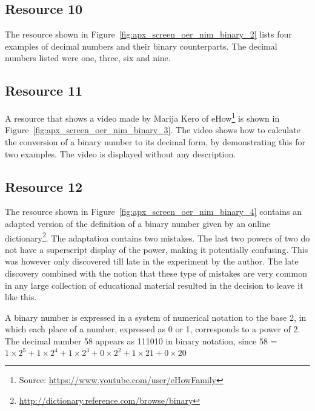\subsection{Resource 10}
The resource shown in Figure~\ref{fig:apx_screen_oer_nim_binary_2} lists four
examples of decimal numbers and their binary counterparts.
The decimal numbers listed were one, three, six and nine.
\subsection{Resource 11}
A resource that shows a video made by Marija Kero of eHow\footnote{Source:
	\url{https://www.youtube.com/user/eHowFamily}} is shown in
	Figure~\ref{fig:apx_screen_oer_nim_binary_3}.
The video shows how to calculate the conversion of a binary number to its
decimal form, by demonstrating this for two examples. The video is displayed
without any description.
\subsection{Resource 12}
The resource shown in Figure~\ref{fig:apx_screen_oer_nim_binary_4} contains
an adapted version of the definition of a binary number given by an online
dictionary\footnote{\url{http://dictionary.reference.com/browse/binary}}.
The adaptation contains two mistakes. The last two powers of two do not have
a superscript display of the power, making it potentially confusing. This was
however only discovered till late in the experiment by the author. The late
discovery combined with the notion that these type of mistakes are very common
in any large collection of educational material resulted in the decision to
leave it like this.
\begin{framed}\noindent
 A binary number is expressed in a system of numerical notation to the base 2,
 in which each place of a number, expressed as 0 or 1, corresponds to a power
 of 2. The decimal number 58 appears as 111010 in binary notation, since 58
 = $1\times2^5+1\times2^4+1\times2^3+0\times2^2+1\times21+0\times20$
\end{framed}
